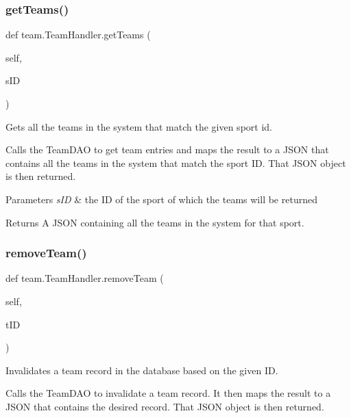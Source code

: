 \subsubsection{\texorpdfstring{get\+Teams()}{getTeams()}}
{\footnotesize\ttfamily def team.\+Team\+Handler.\+get\+Teams (\begin{DoxyParamCaption}\item[{}]{self,  }\item[{}]{s\+ID }\end{DoxyParamCaption})}



Gets all the teams in the system that match the given sport id. 

Calls the Team\+D\+AO to get team entries and maps the result to a J\+S\+ON that contains all the teams in the system that match the sport ID. That J\+S\+ON object is then returned.


\begin{DoxyParams}{Parameters}
{\em s\+ID} & the ID of the sport of which the teams will be returned\\
\hline
\end{DoxyParams}
\begin{DoxyReturn}{Returns}
A J\+S\+ON containing all the teams in the system for that sport. 
\end{DoxyReturn}
\mbox{\label{classteam_1_1_team_handler_a7cc8136e302248a1ddcdef5c2d099de5}} 
\subsubsection{\texorpdfstring{remove\+Team()}{removeTeam()}}
{\footnotesize\ttfamily def team.\+Team\+Handler.\+remove\+Team (\begin{DoxyParamCaption}\item[{}]{self,  }\item[{}]{t\+ID }\end{DoxyParamCaption})}



Invalidates a team record in the database based on the given ID. 

Calls the Team\+D\+AO to invalidate a team record. It then maps the result to a J\+S\+ON that contains the desired record. That J\+S\+ON object is then returned.


